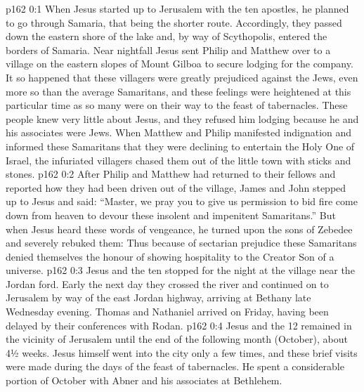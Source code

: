 \author{Midwayer Commission}
\vs p162 0:1 When Jesus started up to Jerusalem with the ten apostles, he planned to go through Samaria, that being the shorter route. Accordingly, they passed down the eastern shore of the lake and, by way of Scythopolis, entered the borders of Samaria. Near nightfall Jesus sent Philip and Matthew over to a village on the eastern slopes of Mount Gilboa to secure lodging for the company. It so happened that these villagers were greatly prejudiced against the Jews, even more so than the average Samaritans, and these feelings were heightened at this particular time as so many were on their way to the feast of tabernacles. These people knew very little about Jesus, and they refused him lodging because he and his associates were Jews. When Matthew and Philip manifested indignation and informed these Samaritans that they were declining to entertain the Holy One of Israel, the infuriated villagers chased them out of the little town with sticks and stones.
\vs p162 0:2 After Philip and Matthew had returned to their fellows and reported how they had been driven out of the village, James and John stepped up to Jesus and said: “Master, we pray you to give us permission to bid fire come down from heaven to devour these insolent and impenitent Samaritans.” But when Jesus heard these words of vengeance, he turned upon the sons of Zebedee and severely rebuked them:  Thus because of sectarian prejudice these Samaritans denied themselves the honour of showing hospitality to the Creator Son of a universe.
\vs p162 0:3 Jesus and the ten stopped for the night at the village near the Jordan ford. Early the next day they crossed the river and continued on to Jerusalem by way of the east Jordan highway, arriving at Bethany late Wednesday evening. Thomas and Nathaniel arrived on Friday, having been delayed by their conferences with Rodan.
\vs p162 0:4 \pc Jesus and the 12 remained in the vicinity of Jerusalem until the end of the following month (October), about 4½ weeks. Jesus himself went into the city only a few times, and these brief visits were made during the days of the feast of tabernacles. He spent a considerable portion of October with Abner and his associates at Bethlehem.
